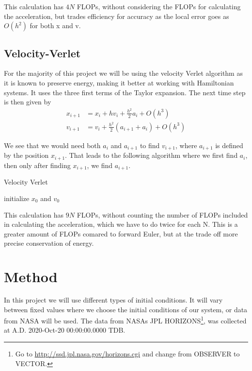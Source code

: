 \documentclass[%
reprint,
nofootinbib,
amsmath,amssymb,
aps,
]{revtex4-1}
\begin{document}
This calculation has $4N$ FLOPs, without considering the FLOPs for calculating the acceleration, but trades efficiency for accuracy as the local error goes as $O(h^2)$ for both x and v. 
\subsection{Velocity-Verlet}%
For the majority of this project we will be using the velocity Verlet algorithm as it is known to preserve energy, making it better at working with Hamiltonian systems. It uses the three first terms of the Taylor expansion. The next time step is then given by 
\begin{align}
		x_{i+1} &= x_i + hv_i + \frac{h^2}{2} a_i + O(h^3)\\
		v_{i+1} &= v_i + \frac{h^2}{2}\left(a_{i+1} + a_i\right) + O(h^3)
\end{align}


We see that we would need both $a_i$ and $a_{i+1}$ to find $v_{i+1}$, where $a_{i+1}$ is defined by the position $x_{i+1}$. That leads to the following algorithm where we first find $a_i$, then only after finding $x_{i+1}$, we find $a_{i+1}$. 
\begin{algorithm}[H]\label{algo:VV}
	\SetAlgoLined
	\caption{Velocity Verlet}
	initialize $x_0$ and $v_0$\;
\end{algorithm}

This calculation has $9N$ FLOPs, without counting the number of FLOPs included in calculating the acceleration, which we have to do twice for each N. This is a greater amount of FLOPs comared to forward Euler, but at the trade off more precise conservation of energy. 

\section{Method}%
In this project we will use different types of initial conditions. It will vary between fixed values where we choose the initial conditions of our system, or data from NASA will be used. The data from NASAs JPL HORIZONS\footnote{Go to \url{http://ssd.jpl.nasa.gov/horizons.cgi} and change from OBSERVER to VECTOR.}, was collected at A.D. 2020-Oct-20 00:00:00.0000 TDB. 
\end{document}
